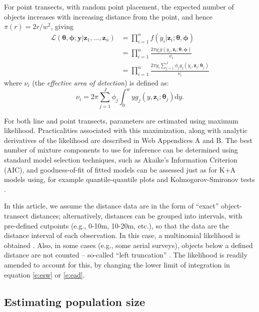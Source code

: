 \documentclass[authoryear,preprint,review,12pt]{elsarticle}
\begin{document}
For point transects, with random point placement, the expected number of objects increases with increasing distance from the point, and hence $\pi(r)=2r/w^2$, giving
\begin{align*}
\mathcal{L}(\bm{\theta},\bm{\phi}; \mathbf{y}  \vert \bm{z}_1, \ldots, \bm{z}_n) &= \prod_{i=1}^n f(y_i \vert \bm{z}_i; \bm{\theta},\bm{\phi})\\
&= \prod_{i=1}^n \frac{2 \pi y_i g(y_i,\bm{z}_i; \bm{\theta},\bm{\phi})}{\nu_i}\\
&= \prod_{i=1}^n \frac{2 \pi y_i \sum_{j=1}^J \phi_j g_j(y_i,\bm{z}_i; \bm{\theta}_j)}{\nu_i}
\end{align*}
where $\nu_i$ (the \textit{effective area of detection}) is defined as:
\begin{equation}
\label{e:ead}
\nu_i = 2\pi \sum_{j=1}^J \phi_j \int_0^w  y g_j(y,\bm{z}_i; \bm{\theta}_j) \text{d}y.
\end{equation}

For both line and point transects, parameters are estimated using maximum likelihood. Practicalities associated with this maximization, along with analytic derivatives of the likelihood are described in Web Appendices A and B.  The best number of mixture components to use for inference can be determined using standard model selection techniques, such as Akaike's Information Criterion (AIC), and goodness-of-fit of fitted models can be assessed just as for K+A models using, for example quantile-quantile plots and Kolmogorov-Smironov tests \citep[see][Section 11.11]{Buckland:2004ts}.

In this article, we assume the distance data are in the form of ``exact'' object-transect distances; alternatively, distances can be grouped into intervals, with pre-defined cutpoints (e.g., 0-10m, 10-20m, etc.), so that the data are the distance interval of each observation.  In this case, a multinomial likelihood is obtained \citep[see, e.g.][Section 3.3.2]{Buckland:2001vm}.  Also, in some cases (e.g., some aerial surveys), objects below a defined distance are not counted -- so-called ``left truncation'' \citep[][Section 4.3.2]{Buckland:2001vm}.  The likelihood is readily amended to account for this, by changing the lower limit of integration in equation \eqref{e:esw} or \eqref{e:ead}.

\subsection{Estimating population size}
\label{s:popsize}
\end{document}
